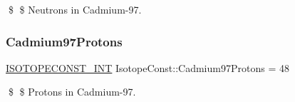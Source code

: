 \$ \$ Neutrons in Cadmium-\/97. \mbox{\label{group___isotope_const-_cadmium-_cd97_gaba6325afff58868bf53444ba74fc63aa}} 
\subsubsection{\texorpdfstring{Cadmium97\+Protons}{Cadmium97Protons}}
{\footnotesize\ttfamily \mbox{\hyperlink{group___isotope_const-_macros_ga5f18360b3e99483a35c32d789e62621c}{I\+S\+O\+T\+O\+P\+E\+C\+O\+N\+S\+T\+\_\+\+I\+NT}} Isotope\+Const\+::\+Cadmium97\+Protons = 48}

\$ \$ Protons in Cadmium-\/97. 